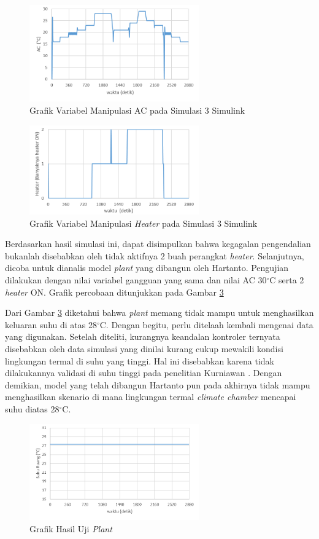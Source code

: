 \begin{figure}[!h]
	\centering
	\includegraphics[width=0.65\textwidth]{figures/Simulink3AC}
	\caption{Grafik Variabel Manipulasi AC pada Simulasi 3 Simulink}
	\label{fig:5:Simulink3AC}
\end{figure}
\vspace{1em}

\begin{figure}[!h]
	\centering
	\includegraphics[width=0.65\textwidth]{figures/Simulink3HT}
	\caption{Grafik Variabel Manipulasi \textit{Heater} pada Simulasi 3 Simulink}
	\label{fig:5:Simulink3HT}
\end{figure}
\vspace{1em}

Berdasarkan hasil simulasi ini, dapat disimpulkan bahwa kegagalan pengendalian bukanlah disebabkan oleh tidak aktifnya 2 buah perangkat \textit{heater}. Selanjutnya, dicoba untuk dianalis model \textit{plant} yang dibangun oleh Hartanto. Pengujian dilakukan dengan nilai variabel gangguan yang sama dan nilai AC 30$^\circ$C serta 2 \textit{heater} ON. Grafik percobaan ditunjukkan pada Gambar \ref{fig:5:UjiPlant}

Dari Gambar \ref{fig:5:UjiPlant} diketahui bahwa \textit{plant} memang tidak mampu untuk menghasilkan keluaran suhu di atas 28$^\circ$C. Dengan begitu, perlu ditelaah kembali mengenai data yang digunakan. Setelah diteliti, kurangnya keandalan kontroler ternyata disebabkan oleh data simulasi yang dinilai kurang cukup mewakili kondisi lingkungan termal di suhu yang tinggi. Hal ini disebabkan karena tidak dilakukannya validasi di suhu tinggi pada penelitian Kurniawan \cite{skripsiIchfan}. Dengan demikian, model yang telah dibangun Hartanto pun pada akhirnya tidak mampu menghasilkan skenario di mana lingkungan termal \textit{climate chamber} mencapai suhu diatas 28$^\circ$C.

\begin{figure}[!h]
	\centering
	\includegraphics[width=0.65\textwidth]{figures/UjiPlant}
	\caption{Grafik Hasil Uji \textit{Plant}}
	\label{fig:5:UjiPlant}
\end{figure}